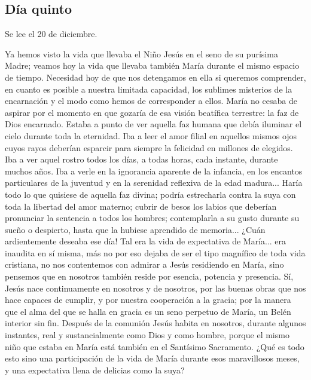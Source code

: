 \documentclass[spanish,utf8,twocolumn]{chlart}
\newenvironment{summary}{\begingroup
	\small\sffamily\itshape%
	\setlength{\leftskip}{3em}\setlength{\rightskip}{3em}\noindent
	}{\par\endgroup}
\newenvironment{lectura}{\begingroup\color{lector}}{\endgroup\par}
\begin{document}
\subsection*{Día quinto}
\begin{summary}
Se lee el 20 de diciembre.
\end{summary}
\begin{lectura}
Ya hemos visto la vida que llevaba el Niño Jesús en el seno de su
purísima Madre; veamos hoy la vida que llevaba también María durante el
mismo espacio de tiempo.
Necesidad hoy de que nos detengamos en ella si queremos comprender, en
cuanto es posible a nuestra limitada capacidad, los sublimes misterios
de la encarnación y el modo como hemos de corresponder a ellos.
María no cesaba de aspirar por el momento en que gozaría de esa visión
beatífica terrestre:
la faz de Dios encarnado.
Estaba a punto de ver aquella faz humana que debía iluminar el cielo
durante toda la eternidad.
Iba a leer el amor filial en aquellos mismos ojos cuyos rayos deberían
esparcir para siempre la felicidad en millones de elegidos.
Iba a ver aquel rostro todos los días, a todas horas, cada instante,
durante muchos años.
Iba a verle en la ignorancia aparente de la infancia, en los encantos
particulares de la juventud y en la serenidad reflexiva de la edad
madura...
Haría todo lo que quisiese de aquella faz divina; podría estrecharla
contra la suya con toda la libertad del amor materno; cubrir de besos
los labios que deberían pronunciar la sentencia a todos los hombres;
contemplarla a su gusto durante su sueño o despierto, hasta que la
hubiese aprendido de memoria...
¿Cuán ardientemente deseaba ese día!
Tal era la vida de expectativa de María...
era inaudita en sí misma, más no por eso dejaba de ser el tipo magnífico
de toda vida cristiana, no nos contentemos con admirar a Jesús
residiendo en María, sino pensemos que en nosotros también reside por
esencia, potencia y presencia.
Sí, Jesús nace continuamente en nosotros y de nosotros, por las buenas
obras que nos hace capaces de cumplir, y por nuestra cooperación a la
gracia; por la manera que el alma del que se halla en gracia es un seno
perpetuo de María, un Belén interior sin fin.
Después de la comunión Jesús habita en nosotros, durante algunos
instantes, real y sustancialmente como Dios y como hombre, porque el
mismo niño que estaba en María está también en el Santísimo Sacramento.
¿Qué es todo esto sino una participación de la vida de María durante
esos maravillosos meses, y una expectativa llena de delicias como la
suya?
\end{lectura}
\end{document}
